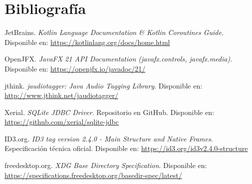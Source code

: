 \documentclass[12pt,a4paper]{article}
\begin{document}
\section{Bibliografía}
\begin{enumerate}[label={[\arabic*]}, leftmargin=2em]
    \item JetBrains. \textit{Kotlin Language Documentation \& Kotlin Coroutines Guide}. Disponible en: \url{https://kotlinlang.org/docs/home.html}
    \item OpenJFX. \textit{JavaFX 21 API Documentation (javafx.controls, javafx.media)}. Disponible en: \url{https://openjfx.io/javadoc/21/}
    \item jthink. \textit{jaudiotagger: Java Audio Tagging Library}. Disponible en: \url{http://www.jthink.net/jaudiotagger/}
    \item Xerial. \textit{SQLite JDBC Driver}. Repositorio en GitHub. Disponible en: \url{https://github.com/xerial/sqlite-jdbc}
    \item ID3.org. \textit{ID3 tag version 2.4.0 - Main Structure and Native Frames}. Especificación técnica oficial. Disponible en: \url{https://id3.org/id3v2.4.0-structure}
    \item freedesktop.org. \textit{XDG Base Directory Specification}. Disponible en: \url{https://specifications.freedesktop.org/basedir-spec/latest/}
\end{enumerate}
\end{document}
